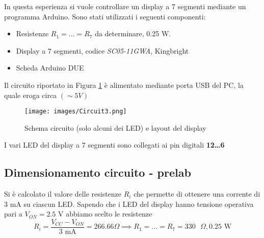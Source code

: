 In questa esperienza si vuole controllare un display a 7 segmenti mediante un programma Arduino. Sono stati utilizzati i seguenti componenti:
\begin{itemize}
    \item Resistenze $R_1=\dots=R_7$ da determinare, 0.25 W.
    \item Display a 7 segmenti,  codice \textit{SC05-11GWA}, Kingbright 
    \item Scheda Arduino DUE
\end{itemize}
Il circuito riportato in Figura \ref{fig:Circuit3} è alimentato mediante porta USB del PC, la quale eroga circa $(\sim 5 V)$
\begin{figure}[H]
    \centering
    \texttt{[image: images/Circuit3.png]}
    \caption{Schema circuito (solo alcuni dei LED) e layout del display}
    \label{fig:Circuit3}
\end{figure}
I vari LED del display a 7 segmenti sono collegati ai pin digitali \textbf{12\dots6}
\subsection{Dimensionamento circuito - prelab}
Si è calcolato il valore delle resistenze $R_i$ che permette di ottenere una corrente di 3 mA su ciascun LED. Sapendo che i LED del display hanno tensione operativa pari a $V_{ON}=2.5\text{ V}$ abbiamo scelto le resistenze
\begin{equation*}
    R_i=\frac{V_{CC}-V_{ON}}{3\text{ mA}}=266.66\Omega\implies R_1=\dots=R_7=330\text{ }\Omega, 0.25\text{ W}
\end{equation*}
\clearpage
